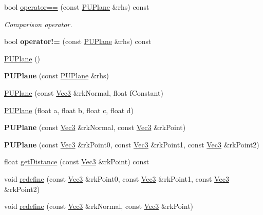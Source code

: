 \begin{DoxyCompactItemize}
\mbox{\label{classPUPlane_a19cf56a14747ea1a4c3a82e3bbaf9782}} 
bool \hyperlink{classPUPlane_a19cf56a14747ea1a4c3a82e3bbaf9782}{operator==} (const \hyperlink{classPUPlane}{P\+U\+Plane} \&rhs) const
\begin{DoxyCompactList}\small\item\em Comparison operator. \end{DoxyCompactList}\item 
\mbox{\label{classPUPlane_a5c3e931b0efda77fec78780ca06a096e}} 
bool {\bfseries operator!=} (const \hyperlink{classPUPlane}{P\+U\+Plane} \&rhs) const
\item 
\hyperlink{classPUPlane_aaf50baadbaeb2624cfbecb6ca2dbff78}{P\+U\+Plane} ()
\item 
\mbox{\label{classPUPlane_a89894825c77c17439344cbf3ca617296}} 
{\bfseries P\+U\+Plane} (const \hyperlink{classPUPlane}{P\+U\+Plane} \&rhs)
\item 
\hyperlink{classPUPlane_a58477f1c39a22c2c6feddb85c1559544}{P\+U\+Plane} (const \hyperlink{classVec3}{Vec3} \&rk\+Normal, float f\+Constant)
\item 
\hyperlink{classPUPlane_af65211380d976874fee10f0ed0122535}{P\+U\+Plane} (float a, float b, float c, float d)
\item 
\mbox{\label{classPUPlane_aa8db8fdce9fd121ab5c4941c26b495db}} 
{\bfseries P\+U\+Plane} (const \hyperlink{classVec3}{Vec3} \&rk\+Normal, const \hyperlink{classVec3}{Vec3} \&rk\+Point)
\item 
\mbox{\label{classPUPlane_a6328c70b570e570477bb997e8c346500}} 
{\bfseries P\+U\+Plane} (const \hyperlink{classVec3}{Vec3} \&rk\+Point0, const \hyperlink{classVec3}{Vec3} \&rk\+Point1, const \hyperlink{classVec3}{Vec3} \&rk\+Point2)
\item 
float \hyperlink{classPUPlane_a8d46bb12b79dfa18db08e2a59776191e}{get\+Distance} (const \hyperlink{classVec3}{Vec3} \&rk\+Point) const
\item 
void \hyperlink{classPUPlane_ab5f749af7164a88b60533ab92f93456f}{redefine} (const \hyperlink{classVec3}{Vec3} \&rk\+Point0, const \hyperlink{classVec3}{Vec3} \&rk\+Point1, const \hyperlink{classVec3}{Vec3} \&rk\+Point2)
\item 
void \hyperlink{classPUPlane_a28e4eb42319176fc722d461c7bbf882b}{redefine} (const \hyperlink{classVec3}{Vec3} \&rk\+Normal, const \hyperlink{classVec3}{Vec3} \&rk\+Point)

\end{DoxyCompactItemize}
